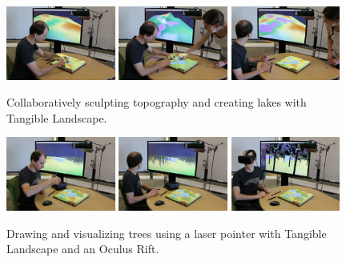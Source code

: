 \documentclass[prodmode,acmtochi]{acmsmall} %
\begin{document}
\begin{figure}
\begin{center}
		\includegraphics[width=0.32\textwidth]{images/immersive/sculpting_lakes_2.png}
		\includegraphics[width=0.32\textwidth]{images/immersive/sculpting_landforms_2.png}
		\includegraphics[width=0.32\textwidth]{images/immersive/sculpting_landforms_3.png}
	\caption{Collaboratively sculpting topography and creating lakes with Tangible Landscape.}
	\label{fig:collaboration}
\end{center}
\end{figure}

\begin{figure}
\begin{center}
		\includegraphics[width=0.32\textwidth]{images/immersive/drawing_trees_1.png}
		\includegraphics[width=0.32\textwidth]{images/immersive/drawing_trees_2.png}
		\includegraphics[width=0.32\textwidth]{images/immersive/trees_with_oculus_1.png}
	\caption{Drawing and visualizing trees using a laser pointer with Tangible Landscape and an Oculus Rift.}
	\label{fig:drawing_trees}
\end{center}
\end{figure}
\end{document}
